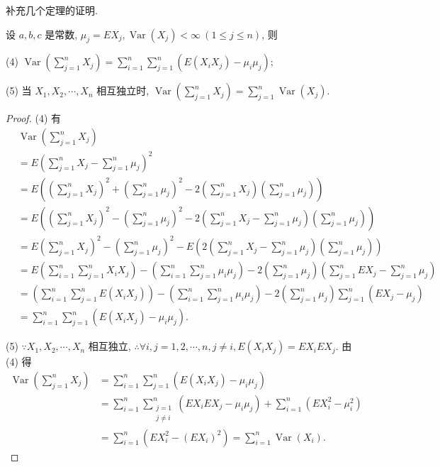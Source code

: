 \documentclass[color=black,device=normal,lang=cn]{elegantnote}
\numberwithin{equation}{section}
\theoremstyle{plain}
\numberwithin{exercise}{exsection}
\begin{document}
补充几个定理的证明.
\begin{theorem}[书上的定理 5.2]\label{t9.1}
    设 $a,b,c$ 是常数, $\mu_j=EX_j,\operatorname{Var}(X_j)<\infty\ (1\leq j\leq n)$, 则
    
    (4) $\operatorname{Var}\left(\sum\limits_{j=1}^nX_j\right)=\sum\limits_{i=1}^n\sum\limits_{j=1}^n(E(X_iX_j)-\mu_i\mu_j)$;
    
    (5) 当 $X_1,X_2,\cdots,X_n$ 相互独立时, $\operatorname{Var}\left(\sum\limits_{j=1}^nX_j\right)=\sum\limits_{j=1}^n\operatorname{Var}(X_j)$.
\end{theorem}
\begin{proof}
    (4) 有
    \begin{align*}
        & \operatorname{Var}\left(\sum\limits_{j=1}^nX_j\right) \\
        & =E\left(\sum\limits_{j=1}^nX_j-\sum\limits_{j=1}^n\mu_j\right)^2 \\
        & =E\left(\left(\sum\limits_{j=1}^nX_j\right)^2+\left(\sum\limits_{j=1}^n\mu_j\right)^2-2\left(\sum\limits_{j=1}^nX_j\right)\left(\sum\limits_{j=1}^n\mu_j\right)\right) \\
        & =E\left(\left(\sum\limits_{j=1}^nX_j\right)^2-\left(\sum\limits_{j=1}^n\mu_j\right)^2-2\left(\sum\limits_{j=1}^nX_j-\sum\limits_{j=1}^n\mu_j\right)\left(\sum\limits_{j=1}^n\mu_j\right)\right) \\
        & =E\left(\sum\limits_{j=1}^nX_j\right)^2-\left(\sum\limits_{j=1}^n\mu_j\right)^2-E\left(2\left(\sum\limits_{j=1}^nX_j-\sum\limits_{j=1}^n\mu_j\right)\left(\sum\limits_{j=1}^n\mu_j\right)\right) \\
        & =E\left(\sum\limits_{i=1}^n\sum\limits_{j=1}^nX_iX_j\right)-\left(\sum\limits_{i=1}^n\sum\limits_{j=1}^n\mu_i\mu_j\right)-2\left(\sum\limits_{j=1}^n\mu_j\right)\left(\sum\limits_{j=1}^nEX_j-\sum\limits_{j=1}^n\mu_j\right) \\
        & =\left(\sum\limits_{i=1}^n\sum\limits_{j=1}^nE(X_iX_j)\right)-\left(\sum\limits_{i=1}^n\sum\limits_{j=1}^n\mu_i\mu_j\right)-2\left(\sum\limits_{j=1}^n\mu_j\right)\sum\limits_{j=1}^n(EX_j-\mu_j) \\
        & =\sum\limits_{i=1}^n\sum\limits_{j=1}^n(E(X_iX_j)-\mu_i\mu_j).
    \end{align*}

    (5) $\because X_1,X_2,\cdots,X_n$ 相互独立, $\therefore\forall i,j=1,2,\cdots,n,j\neq i,E(X_iX_j)=EX_iEX_j$. 由 (4) 得
    \begin{align*}
        \operatorname{Var}\left(\sum\limits_{j=1}^nX_j\right) & =\sum\limits_{i=1}^n\sum\limits_{j=1}^n(E(X_iX_j)-\mu_i\mu_j) \\
        & =\sum\limits_{i=1}^n\sum\limits_{\substack{j=1\\j\neq i}}^n(EX_iEX_j-\mu_i\mu_j)+\sum\limits_{i=1}^n(EX_i^2-\mu_i^2) \\
        & =\sum\limits_{i=1}^n(EX_i^2-(EX_i)^2)=\sum\limits_{i=1}^n\operatorname{Var}(X_i).
    \end{align*}
\end{proof}
\end{document}
